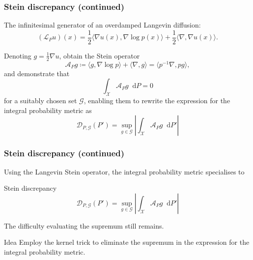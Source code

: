 \documentclass{beamer}
\newcommand*\diff{\mathop{}\!\mathrm{d}}
\begin{document}
\begin{frame}
\frametitle{Stein discrepancy (continued)}

The infinitesimal generator of an overdamped Langevin diffusion:
$$(\mathcal{L}_P u)(x) = \frac{1}{2} \langle \nabla u(x), \nabla \log p(x)\rangle + \frac{1}{2}\langle \nabla, \nabla u(x) \rangle.$$

Denoting $g  = \frac{1}{2}\nabla u$, \cite{gorhamMeasuringSampleQuality2015} obtain the Stein operator
\begin{equation*}
\mathcal{A}_P g \coloneq \langle g, \nabla \log p \rangle + \langle \nabla, g \rangle = \langle p^{-1}\nabla, p g \rangle,
\label{eq:stein-operator}
\end{equation*}
and demonstrate that
\begin{equation*}
\int_{\mathcal{X}} \mathcal{A}_P g \diff P = 0
\end{equation*}
for a suitably chosen set $\mathcal{G}$, enabling them to rewrite the expression for the integral probability metric as
\begin{equation*}
\mathcal{D}_{P, \mathcal{G}}(P') = \sup_{g \in \mathcal{G}}\left|\int_\mathcal{X} \mathcal{A}_P g \diff P' \right|
\label{eq:stein-discrepancy-g}
\end{equation*}

\end{frame}



\begin{frame}
\frametitle{Stein discrepancy (continued)}

Using the Langevin Stein operator, the integral probability metric specialises to
\begin{block}{Stein discrepancy}
\begin{equation*}
\mathcal{D}_{P, \mathcal{G}}(P') = \sup_{g \in \mathcal{G}}\left|\int_\mathcal{X} \mathcal{A}_P g \diff P' \right|
\end{equation*}
\end{block}

The difficulty evaluating the supremum still remains.

\begin{block}{Idea}
Employ the kernel trick to eliminate the supremum in the expression for the integral probability metric.
\end{block}

\end{frame}
\end{document}
